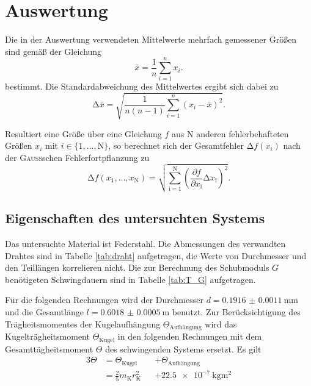 \newpage
\section{Auswertung}
\label{sec:Auswertung}
Die in der Auswertung verwendeten Mittelwerte mehrfach gemessener Größen sind gemäß der Gleichung
\begin{equation}
    \bar{x}=\frac{1}{n}\sum_{i=1}^n x_i.
    \label{eq:mittelwert}
\end{equation}
bestimmt. 
Die Standardabweichung des Mittelwertes ergibt sich dabei zu
\begin{equation}
    \mathup{\Delta}\bar{x}=\sqrt{\frac{1}{n(n-1)}\sum_{i=1}^n\left(x_i-\bar{x}\right)^2}.
    \label{eq:standardabweichung}
\end{equation}

Resultiert eine Größe über eine Gleichung $f$ aus N anderen fehlerbehafteten Größen $x_i$ mit $i\in\{1,…,\text{N}\}$, so
berechnet sich der Gesamtfehler $\mathup{\Delta}f(x_i)$ nach der \textsc{Gauß}schen Fehlerfortpflanzung zu
\begin{equation}
	\mathup{\Delta}f(x_1,...,x_\text{N})=\sqrt{\sum_{\text{i}=1}^\text{N}\left(\frac{\partial f}{\partial x_\text{i}}\mathup{\Delta}x_\text{i}\right)^2}.
	\label{eq:gauss_gen}
\end{equation}

\subsection{Eigenschaften des untersuchten Systems}
\label{sec:auswertung1}
Das untersuchte Material ist Federstahl.
Die Abmessungen des verwandten Drahtes sind in Tabelle \ref{tab:draht} aufgetragen, die Werte von Durchmesser und den Teillängen korrelieren nicht.
Die zur Berechnung des Schubmoduls $G$ benötigeten Schwingdauern sind in Tabelle \ref{tab:T_G} aufgetragen.

Für die folgenden Rechnungen wird der Durchmesser $d=\SI{0.1916(11)}{\milli\meter}$ und die Gesamtlänge $l=\SI{0.6018(5)}{\meter}$ benutzt.
\newpage
Zur Berücksichtigung des Trägheitsmomentes der Kugelaufhängung $\Theta_\text{Aufhängung}$ wird das Kugelträgheitsmoment $\Theta_\text{Kugel}$ in den folgenden Rechnungen mit dem Gesamttägheitsmoment $\Theta$ des schwingenden Systems ersetzt.
Es gilt  
\begin{alignat}{3}
	\Theta	&=\Theta_\text{Kugel} &&+\Theta_\text{Aufhängung}\label{eq:gesamttraegheit}\\ 
		&=\frac{2}{5} m_\text{K} r_\text{K}^2 &&+\SI{22.5e-7}{\kilo\gram\meter\squared}
\end{alignat}
